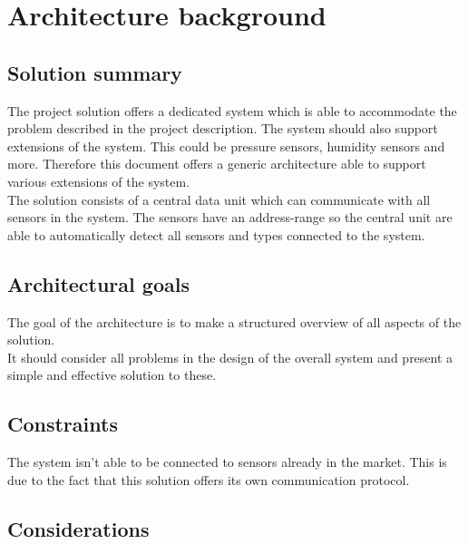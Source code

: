 \chapter{Architecture background}

\section{Solution summary}
The project solution offers a dedicated system which is able to accommodate the problem described in the project description. The system should also support extensions of the system. This could be pressure sensors, humidity sensors and more. Therefore this document offers a generic architecture able to support various extensions of the system.\\
The solution consists of a central data unit which can communicate with all sensors in the system. The sensors have an address-range so the central unit are able to automatically detect all sensors and types connected to the system. 

\section{Architectural goals}
The goal of the architecture is to make a structured overview of all aspects of the solution.\\
It should consider all problems in the design of the overall system and present a simple and effective solution to these.\\

\section{Constraints}
The system isn't able to be connected to sensors already in the market. This is due to the fact that this solution offers its own communication protocol.\\

\section{Considerations}


